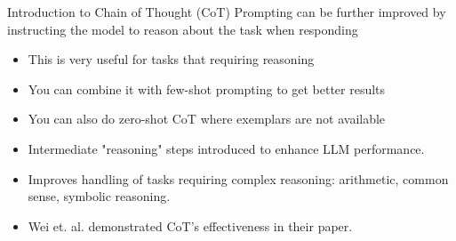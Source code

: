 



\begin{frame}[fragile]{Introduction to Chain of Thought (CoT)}
Prompting can be further improved by instructing the 
model to reason about the task when responding

    \begin{itemize}
		\item This is very useful for tasks that requiring reasoning 
		\item You can combine it with few-shot prompting to get better results 
		\item You can also do zero-shot CoT where exemplars are not available	
        \item Intermediate "reasoning" steps introduced to enhance LLM performance.
        \item Improves handling of tasks requiring complex reasoning: arithmetic, common sense, symbolic reasoning.
        \item Wei et. al. demonstrated CoT's effectiveness in their paper.
    \end{itemize}
\end{frame}

